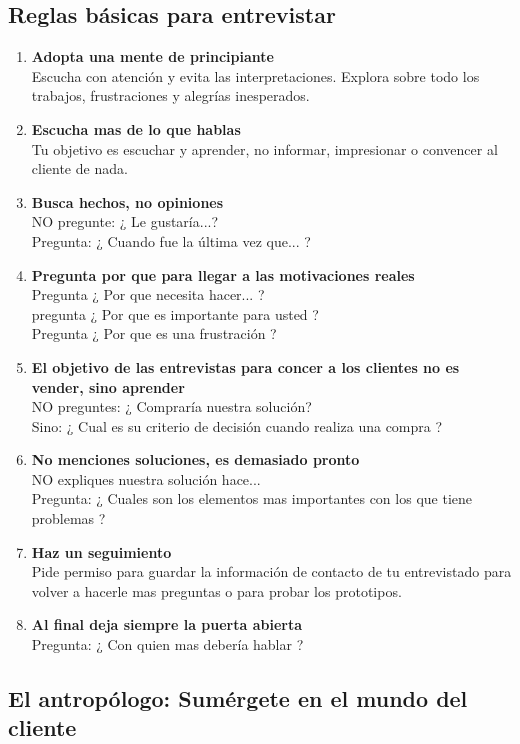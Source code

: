 \documentclass[11pt]{book}
\begin{document}
\subsection{Reglas básicas para entrevistar}
\begin{enumerate}
\item \textbf{ Adopta una mente de principiante }\\
Escucha con atención y evita las interpretaciones. 
Explora sobre todo los trabajos, frustraciones y alegrías inesperados.
\item \textbf{ Escucha mas de lo que hablas }\\
Tu objetivo es escuchar y aprender, no informar, impresionar o convencer al cliente de nada.
\item \textbf{ Busca hechos, no opiniones }\\
NO pregunte: ¿ Le gustaría...?\\
Pregunta: ¿ Cuando fue la última vez que... ?
\item \textbf{ Pregunta por que para llegar a las motivaciones reales }\\
Pregunta ¿ Por que necesita hacer... ?\\
pregunta ¿ Por que es importante para usted ?\\
Pregunta ¿ Por que es una frustración ?

\item \textbf{ El objetivo de las entrevistas para concer a los clientes no es vender, sino aprender }\\
NO preguntes: ¿ Compraría nuestra solución?\\
Sino: ¿ Cual es su criterio de decisión cuando realiza una compra ?
\item \textbf{ No menciones soluciones, es demasiado pronto }\\
NO expliques nuestra solución hace...\\
Pregunta: ¿ Cuales son los elementos mas importantes con los que tiene problemas ?

\item \textbf{ Haz un seguimiento }\\
Pide permiso para guardar la información de contacto de tu entrevistado para volver a hacerle mas preguntas o para probar los prototipos.
\item \textbf{ Al final deja siempre la puerta abierta }\\
Pregunta: ¿ Con quien mas debería hablar ?
\end{enumerate}
\subsection{El antropólogo: Sumérgete en el mundo del cliente}
\end{document}
